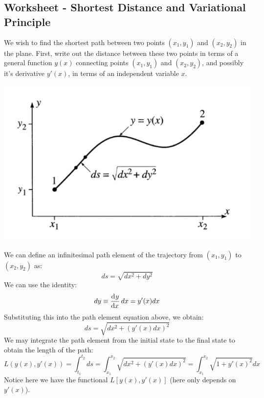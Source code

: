 \subsection{Worksheet - Shortest Distance and Variational Principle}
\begin{p}
We wish to find the shortest path between two points $(x_1,y_1)$ and $(x_2,y_2)$ in the plane. First, write out the distance between these two points in terms of a general function $y(x)$ connecting points $(x_1,y_1)$ and $(x_2,y_2)$, and possibly it’s derivative $y'(x)$, in terms of an independent variable $x$.
\begin{center}
    \includegraphics[scale=0.6]{Lecture-1/W1-img1.png}
\end{center}
\end{p}
\begin{s}
We can define an infinitesimal path element of the trajectory from $(x_1, y_1)$ to $(x_2, y_2)$ as:
\[ ds = \sqrt{dx^2 + dy^2}\]
We can use the identity:
\[ dy \equiv \dod{y}{x}dx = y'(x)dx\]
Substituting this into the path element equation above, we obtain:
\[ds = \sqrt{dx^2 + \left(y'(x)dx\right)^2}\]
We may integrate the path element from the initial state to the final state to obtain the length of the path:
\[L(y(x), y'(x)) = \int_{t_1}^{t_2} ds = \int_{x_1}^{x_2} \sqrt{dx^2 + \left(y'(x)dx\right)^2} = \int_{x_1}^{x_2} \sqrt{1 + y'(x)^2}dx\]
Notice here we have the functional $L[y(x), y'(x)]$ (here only depends on $y'(x)$). 


\end{s}

